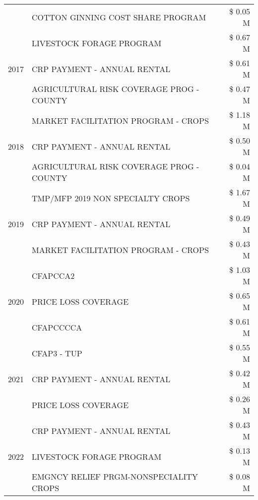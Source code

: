 \begin{tabular}{llr}
 & COTTON GINNING COST SHARE PROGRAM & \$ 0.05 M \\
\cline{1-3}
\multirow[t]{3}{*}{2017} & LIVESTOCK FORAGE PROGRAM & \$ 0.67 M \\
 & CRP PAYMENT - ANNUAL RENTAL & \$ 0.61 M \\
 & AGRICULTURAL RISK COVERAGE PROG - COUNTY & \$ 0.47 M \\
\cline{1-3}
\multirow[t]{3}{*}{2018} & MARKET FACILITATION PROGRAM - CROPS & \$ 1.18 M \\
 & CRP PAYMENT - ANNUAL RENTAL & \$ 0.50 M \\
 & AGRICULTURAL RISK COVERAGE PROG - COUNTY & \$ 0.04 M \\
\cline{1-3}
\multirow[t]{3}{*}{2019} & TMP/MFP 2019 NON SPECIALTY CROPS & \$ 1.67 M \\
 & CRP PAYMENT - ANNUAL RENTAL & \$ 0.49 M \\
 & MARKET FACILITATION PROGRAM - CROPS & \$ 0.43 M \\
\cline{1-3}
\multirow[t]{3}{*}{2020} & CFAPCCA2 & \$ 1.03 M \\
 & PRICE LOSS COVERAGE & \$ 0.65 M \\
 & CFAPCCCCA & \$ 0.61 M \\
\cline{1-3}
\multirow[t]{3}{*}{2021} & CFAP3 - TUP & \$ 0.55 M \\
 & CRP PAYMENT - ANNUAL RENTAL & \$ 0.42 M \\
 & PRICE LOSS COVERAGE & \$ 0.26 M \\
\cline{1-3}
\multirow[t]{3}{*}{2022} & CRP PAYMENT - ANNUAL RENTAL & \$ 0.43 M \\
 & LIVESTOCK FORAGE PROGRAM & \$ 0.13 M \\
 & EMGNCY RELIEF PRGM-NONSPECIALITY CROPS & \$ 0.08 M \\
\cline{1-3}
\bottomrule
\end{tabular}
